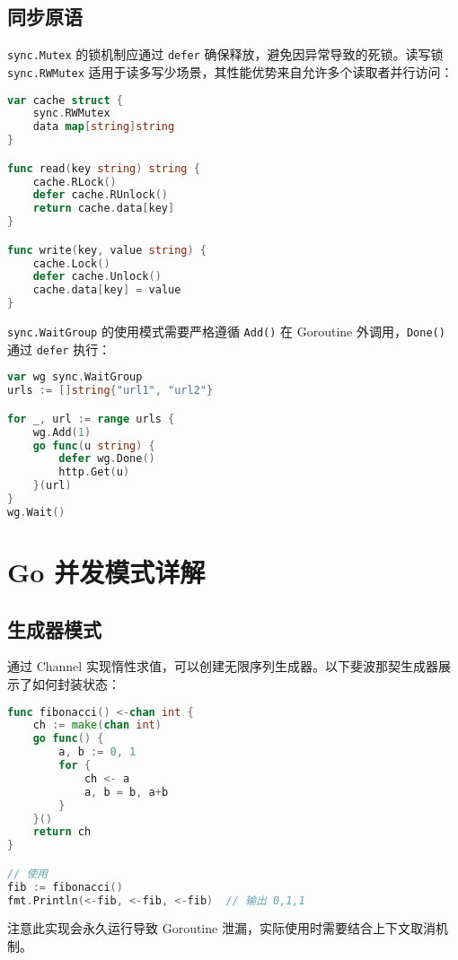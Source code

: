 \section{同步原语}
\verb!sync.Mutex! 的锁机制应通过 \verb!defer! 确保释放，避免因异常导致的死锁。读写锁 \verb!sync.RWMutex! 适用于读多写少场景，其性能优势来自允许多个读取者并行访问：\par
\begin{lstlisting}[language=go]
var cache struct {
    sync.RWMutex
    data map[string]string
}

func read(key string) string {
    cache.RLock()
    defer cache.RUnlock()
    return cache.data[key]
}

func write(key, value string) {
    cache.Lock()
    defer cache.Unlock()
    cache.data[key] = value
}
\end{lstlisting}
\verb!sync.WaitGroup! 的使用模式需要严格遵循 \verb!Add()! 在 Goroutine 外调用，\verb!Done()! 通过 \verb!defer! 执行：\par
\begin{lstlisting}[language=go]
var wg sync.WaitGroup
urls := []string{"url1", "url2"}

for _, url := range urls {
    wg.Add(1)
    go func(u string) {
        defer wg.Done()
        http.Get(u)
    }(url)
}
wg.Wait()
\end{lstlisting}
\chapter{Go 并发模式详解}
\section{生成器模式}
通过 Channel 实现惰性求值，可以创建无限序列生成器。以下斐波那契生成器展示了如何封装状态：\par
\begin{lstlisting}[language=go]
func fibonacci() <-chan int {
    ch := make(chan int)
    go func() {
        a, b := 0, 1
        for {
            ch <- a
            a, b = b, a+b
        }
    }()
    return ch
}

// 使用
fib := fibonacci()
fmt.Println(<-fib, <-fib, <-fib)  // 输出 0,1,1
\end{lstlisting}
注意此实现会永久运行导致 Goroutine 泄漏，实际使用时需要结合上下文取消机制。\par
